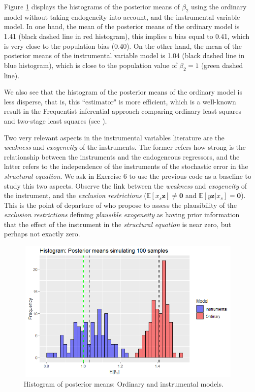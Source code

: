 Figure \ref{fig71} displays the histograms of the posterior means of $\beta_2$ using the ordinary model without taking endogeneity into account, and the instrumental variable model. In one hand, the mean of the posterior means of the ordinary model is 1.41 (black dashed line in red histogram), this implies a bias equal to 0.41, which is very close to the population bias (0.40). On the other hand, the mean of the posterior means of the instrumental variable model is 1.04 (black dashed line in blue histogram), which is close to the population value of $\beta_2=1$ (green dashed line).

We also see that the histogram of the posterior means of the ordinary model is less disperse, that is, this ``estimator" is more efficient, which is a well-known result in the Frequentist inferential approach comparing ordinary least squares and two-stage least squares (see \cite[Chap. ~5]{wooldridge2010econometric}).

Two very relevant aspects in the instrumental variables literature are the \textit{weakness} and \textit{exogeneity} of the instruments. The former refers how strong is the relationship between the instruments and the endogeneous regressors, and the latter refers to the independence of the instruments of the stochastic error in the \textit{structural equation}. We ask in Exercise 6 to use the previous code as a baseline to study this two aspects. Observe the link between the \textit{weakness} and \textit{exogeneity} of the instrument, and the \textit{exclusion restrictions} ($\mathbb{E}[x_s\bm{z}]\neq \bm{0}$ and $\mathbb{E}[y\bm{z}|x_s]=\bm{0}$). This is the point of departure of \cite{Conley2012} who propose to assess the plausibility of the \textit{exclusion restrictions} defining \textit{plausible exogeneity} as having prior information that the effect of the instrument in the \textit{structural equation} is near zero, but perhaps not exactly zero.  
 
\begin{figure}
	\includegraphics[width=340pt, height=200pt]{Chapters/chapter7/figures/Fig71.png}
	\caption[List of figure caption goes here]{Histogram of posterior means: Ordinary and instrumental models.}\label{fig71}
\end{figure}

